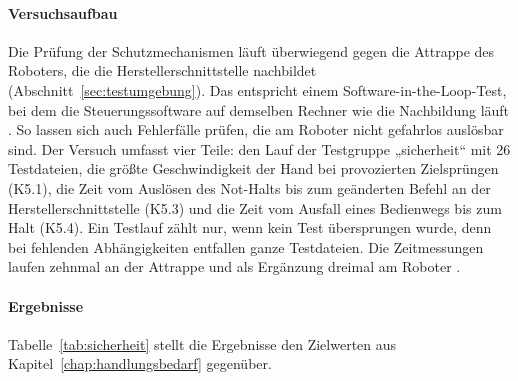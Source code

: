 \paragraph*{Versuchsaufbau}
Die Prüfung der Schutzmechanismen läuft überwiegend gegen die Attrappe des Roboters, die die Herstellerschnittstelle nachbildet (Abschnitt~\ref{sec:testumgebung}).
Das entspricht einem Software-in-the-Loop-Test, bei dem die Steuerungssoftware auf demselben Rechner wie die Nachbildung läuft \cite{Afzal2021}.
So lassen sich auch Fehlerfälle prüfen, die am Roboter nicht gefahrlos auslösbar sind.
Der Versuch umfasst vier Teile: den Lauf der Testgruppe „sicherheit“ mit 26 Testdateien, die größte Geschwindigkeit der Hand bei provozierten Zielsprüngen (K5.1), die Zeit vom Auslösen des Not-Halts bis zum geänderten Befehl an der Herstellerschnittstelle (K5.3) und die Zeit vom Ausfall eines Bedienwegs bis zum Halt (K5.4).
Ein Testlauf zählt nur, wenn kein Test übersprungen wurde, denn bei fehlenden Abhängigkeiten entfallen ganze Testdateien.
Die Zeitmessungen laufen zehnmal an der Attrappe und als Ergänzung dreimal am Roboter .

\paragraph*{Ergebnisse}
Tabelle~\ref{tab:sicherheit} stellt die Ergebnisse den Zielwerten aus Kapitel~\ref{chap:handlungsbedarf} gegenüber.


